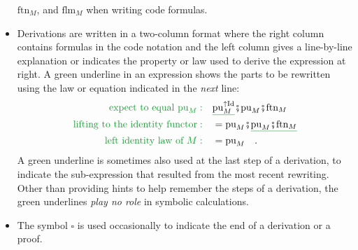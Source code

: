 \begin{itemize}
$\text{ftn}_{M}$, and $\text{flm}_{M}$ when writing code formulas.
\item Derivations are written in a two-column format where the right column
contains formulas in the code notation and the left column gives a
line-by-line explanation or indicates the property or law used to
derive the expression at right. A green underline in an expression
shows the parts to be rewritten using the law or equation indicated
in the \emph{next} line:
\begin{align*}
{\color{greenunder}\text{expect to equal }\text{pu}_{M}:}\quad & \gunderline{\text{pu}_{M}^{\uparrow\text{Id}}}\bef\text{pu}_{M}\bef\text{ftn}_{M}\\
{\color{greenunder}\text{lifting to the identity functor}:}\quad & =\text{pu}_{M}\bef\gunderline{\text{pu}_{M}\bef\text{ftn}_{M}}\\
{\color{greenunder}\text{left identity law of }M:}\quad & =\text{pu}_{M}\quad.
\end{align*}
A green underline is sometimes also used at the last step of a derivation,
to indicate the sub-expression that resulted from the most recent
rewriting. Other than providing hints to help  remember the steps
of a derivation, the green underlines \emph{play no role} in symbolic
calculations.
\item The symbol $\square$ is used occasionally to indicate the end of
a derivation or a proof.
\end{itemize}

